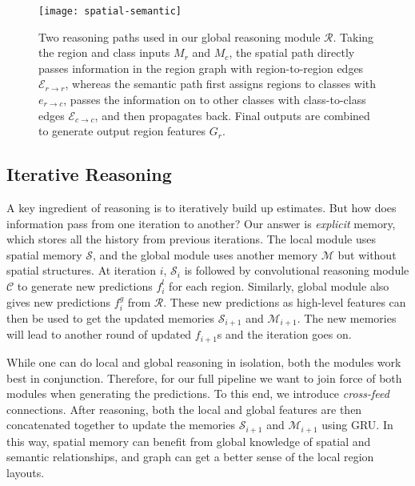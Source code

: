 \documentclass[10pt,twocolumn,letterpaper]{article}
\begin{document}
\begin{figure}[t]
\centering
\texttt{[image: spatial-semantic]}
\caption{{\small Two reasoning paths used in our global reasoning module $\mathcal{R}$. Taking the region and class inputs $M_r$ and $M_c$, the spatial path directly passes information in the region graph with region-to-region edges $\mathcal{E}_{r{\rightarrow}r}$, whereas the semantic path first assigns regions to classes with $e_{r{\rightarrow}c}$, passes the information on to other classes with class-to-class edges $\mathcal{E}_{c{\rightarrow}c}$, and then propagates back. Final outputs are combined to generate output region features $G_r$.}\label{fig:ss}}
\vspace{-0.2in}
\end{figure}

\subsection{Iterative Reasoning\label{iter}}
A key ingredient of reasoning is to iteratively build up estimates. But how does information pass from one iteration to another? Our answer is \emph{explicit} memory, which stores all the history from previous iterations. The local module uses spatial memory $\mathcal{S}$, and the global module uses another memory $\mathcal{M}$ but without spatial structures. At iteration $i$, $\mathcal{S}_i$ is followed by convolutional reasoning module $\mathcal{C}$ to generate new predictions $f_i^l$ for each region. Similarly, global module also gives new predictions $f_i^g$ from $\mathcal{R}$. These new predictions as high-level features can then be used to get the updated memories $\mathcal{S}_{i+1}$ and $\mathcal{M}_{i+1}$. The new memories will lead to another round of updated $f_{i+1}$s and the iteration goes on. 

While one can do local and global reasoning in isolation, both the modules work best in conjunction. Therefore, for our full pipeline we want to join force of both modules when generating the predictions. To this end, we introduce \emph{cross-feed} connections. After reasoning, both the local and global features are then concatenated together to update the memories $\mathcal{S}_{i+1}$ and $\mathcal{M}_{i+1}$ using GRU. In this way, spatial memory can benefit from global knowledge of spatial and semantic relationships, and graph can get a better sense of the local region layouts. 
\end{document}
